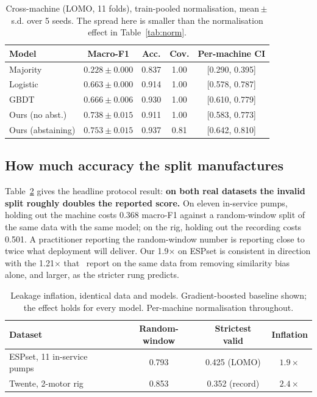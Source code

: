 \documentclass[conference,a4paper,10pt]{IEEEtran}
\begin{document}
\begin{table}[t]
\caption{Cross-machine (LOMO, 11 folds), train-pooled normalisation,
mean\,$\pm$\,s.d. over 5 seeds. The spread here is smaller than the normalisation
effect in Table~\ref{tab:norm}.}
\label{tab:crossmachine}
\centering
\small
\begin{tabular}{lcccc}
\toprule
Model & Macro-F1 & Acc. & Cov. & Per-machine CI \\
\midrule
Majority & $0.228\pm0.000$ & 0.837 & 1.00 & [0.290, 0.395] \\
Logistic & $0.663\pm0.000$ & 0.914 & 1.00 & [0.578, 0.787] \\
GBDT     & $0.666\pm0.006$ & 0.930 & 1.00 & [0.610, 0.779] \\
Ours (no abst.) & $\mathbf{0.738\pm0.015}$ & 0.911 & 1.00 & [0.583, 0.773] \\
Ours (abstaining) & $\mathbf{0.753\pm0.015}$ & 0.937 & 0.81 & [0.642, 0.810] \\
\bottomrule
\end{tabular}
\end{table}

\subsection{How much accuracy the split manufactures}
Table~\ref{tab:leakage} gives the headline protocol result: \textbf{on both real
datasets the invalid split roughly doubles the reported score.} On eleven
in-service pumps, holding out the machine costs 0.368 macro-F1 against a
random-window split of the same data with the same model; on the rig, holding out
the recording costs 0.501. A practitioner reporting the random-window number is
reporting close to twice what deployment will deliver. Our 1.9$\times$ on ESPset
is consistent in direction with the 1.21$\times$ that~\cite{varejao2024} report
on the same data from removing similarity bias alone, and larger, as the stricter
rung predicts.

\begin{table}[t]
\caption{Leakage inflation, identical data and models. Gradient-boosted baseline
shown; the effect holds for every model. Per-machine normalisation throughout.}
\label{tab:leakage}
\centering
\small
\begin{tabular}{lccc}
\toprule
Dataset & Random-window & Strictest valid & Inflation \\
\midrule
ESPset, 11 in-service pumps & 0.793 & 0.425 (LOMO) & $\mathbf{1.9\times}$ \\
Twente, 2-motor rig & 0.853 & 0.352 (record) & $\mathbf{2.4\times}$ \\
\bottomrule
\end{tabular}
\end{table}
\end{document}
